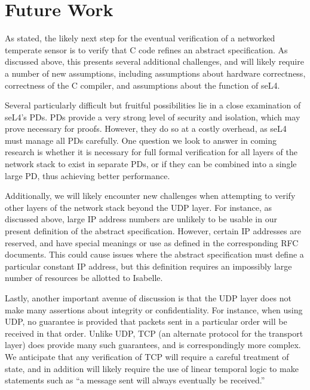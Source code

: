 \documentclass[twoside]{memoir}
\begin{document}
\chapter{Future Work}
As stated, the likely next step for the eventual verification of a networked temperate sensor
is to verify that C code refines an abstract specification.
As discussed above, this presents several additional challenges, and will
likely require a number of new assumptions, including assumptions about
hardware correctness, correctness of the C compiler, and assumptions about the function of seL4.

Several particularly difficult but fruitful possibilities lie in a close examination of
seL4's PDs.
PDs provide a very strong level of security and isolation, which may prove necessary for proofs.
However, they do so at a costly overhead, as seL4 must manage all PDs carefully.
One question we look to answer in coming research is whether it is necessary
for full formal verification for all layers of the network stack to exist in separate PDs,
or if they can be combined into a single large PD, thus achieving better performance.

Additionally, we will likely encounter new challenges when attempting to verify
other layers of the network stack beyond the UDP layer.
For instance, as discussed above, large IP address numbers are unlikely to be usable
in our present definition of the abstract specification.
However, certain IP addresses are reserved, and have special meanings or use as defined in
the corresponding RFC documents.
This could cause issues where the abstract specification must define a particular constant
IP address, but this definition requires an impossibly large number of resources be allotted to
Isabelle.

Lastly, another important avenue of discussion is that the UDP layer does not make many assertions about integrity or confidentiality.
For instance, when using UDP, no guarantee is provided that packets sent in a particular order
will be received in that order.
Unlike UDP, TCP (an alternate protocol for the transport layer) does provide many such guarantees,
and is correspondingly more complex. We anticipate that any verification of TCP will require
a careful treatment of state, and in addition will likely require the use of linear temporal logic
to make statements such as ``a message sent will always eventually be received.''
\end{document}

